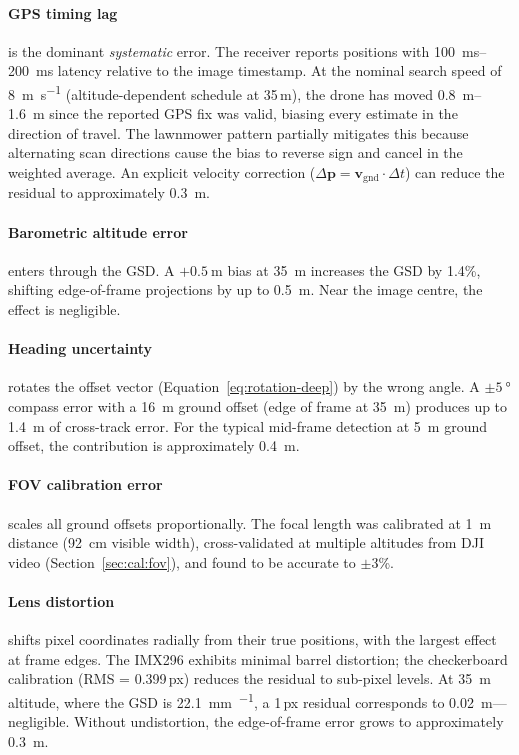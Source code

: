 \paragraph{GPS timing lag}\label{sec:gps-timing-lag} is the dominant \emph{systematic} error.  The receiver reports positions with \SIrange{100}{200}{\milli\second} latency relative to the image timestamp.  At the nominal search speed of \SI{8}{\metre\per\second} (altitude-dependent schedule at 35\,m), the drone has moved \SIrange{0.8}{1.6}{\metre} since the reported GPS fix was valid, biasing every estimate in the direction of travel.  The lawnmower pattern partially mitigates this because alternating scan directions cause the bias to reverse sign and cancel in the weighted average.  An explicit velocity correction ($\Delta\mathbf{p} = \mathbf{v}_\mathrm{gnd}\cdot\Delta t$) can reduce the residual to approximately \SI{0.3}{\metre}.

\paragraph{Barometric altitude error} enters through the GSD.  A $+\SI{0.5}{\metre}$ bias at \SI{35}{\metre} increases the GSD by 1.4\%, shifting edge-of-frame projections by up to \SI{0.5}{\metre}.  Near the image centre, the effect is negligible.

\paragraph{Heading uncertainty} rotates the offset vector (Equation~\ref{eq:rotation-deep}) by the wrong angle.  A $\pm\SI{5}{\degree}$ compass error with a \SI{16}{\metre} ground offset (edge of frame at \SI{35}{\metre}) produces up to \SI{1.4}{\metre} of cross-track error.  For the typical mid-frame detection at \SI{5}{\metre} ground offset, the contribution is approximately \SI{0.4}{\metre}.

\paragraph{FOV calibration error} scales all ground offsets proportionally.  The focal length was calibrated at \SI{1}{\metre} distance (\SI{92}{\centi\metre} visible width), cross-validated at multiple altitudes from DJI video (Section~\ref{sec:cal:fov}), and found to be accurate to $\pm3$\%.

\paragraph{Lens distortion} shifts pixel coordinates radially from their true positions, with the largest effect at frame edges.  The IMX296 exhibits minimal barrel distortion; the checkerboard calibration (RMS = 0.399\,px) reduces the residual to sub-pixel levels.  At \SI{35}{\metre} altitude, where the GSD is \SI{22.1}{\milli\metre\per\px}, a 1\,px residual corresponds to \SI{0.02}{\metre}---negligible.  Without undistortion, the edge-of-frame error grows to approximately \SI{0.3}{\metre}.

